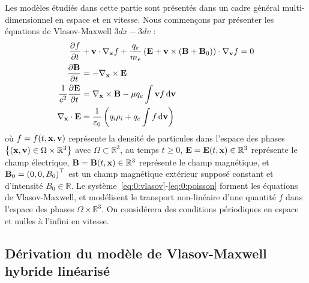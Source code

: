 Les modèles étudiés dans cette partie sont présentés dans un cadre général multi-dimensionnel en espace et en vitesse. Nous commençons par présenter les équations de Vlasov-Maxwell $3dx-3dv$ :
\begin{align}
	\label{eq:0:vlasov}
		\pdv{f}{t} &+ \vb{v}\cdot\nabla_{\vb{x}} f + \frac{q_e}{m_e}\left( \vb{E} + \vb{v}\times(\vb{B}+\vb{B}_0) \right)\cdot\nabla_{\vb{v}} f = 0 \\
	\label{eq:0:maxwellB}
		\pdv{\vb{B}}{t} &= - \nabla_{\vb{x}}\times\vb{E} \\
	\label{eq:0:maxwellE}
		\frac{1}{c^2}\pdv{\vb{E}}{t} &= \nabla_{\vb{x}}\times \vb{B} - \mu q_e\int \vb{v} f\dd{\vb{v}} \\
	\label{eq:0:poisson}
		\nabla_{\vb{x}}\cdot\vb{E} &= \frac{1}{\varepsilon_0}\left( q_i\rho_i + q_e\int f\dd{\vb{v}} \right)
\end{align}
où $f=f(t,\vb{x},\vb{v})$ représente la densité de particules dans l'espace des phases $\left\{ (\vb{x},\vb{v}) \in \Omega\times\mathbb{R}^3 \right\}$ avec $\Omega\subset\mathbb{R}^3$, au temps $t\geq0$, $\vb{E}=\vb{E}(t,\vb{x})\in\mathbb{R}^3$ représente le champ électrique, $\vb{B}=\vb{B}(t,\vb{x})\in\mathbb{R}^3$ représente le champ magnétique, et $\vb{B}_0 = \left(0,0,B_0\right)^\top$ est un champ magnétique extérieur supposé constant et d'intensité $B_0\in\mathbb{R}$. Le système~\eqref{eq:0:vlasov}-\eqref{eq:0:poisson} forment les équations de Vlasov-Maxwell, et modélisent le transport non-linéaire d'une quantité $f$ dans l'espace des phases $\Omega\times\mathbb{R}^3$. On considérera des conditions périodiques en espace et nulles à l'infini en vitesse.

\subsection{Dérivation du modèle de Vlasov-Maxwell hybride linéarisé}

